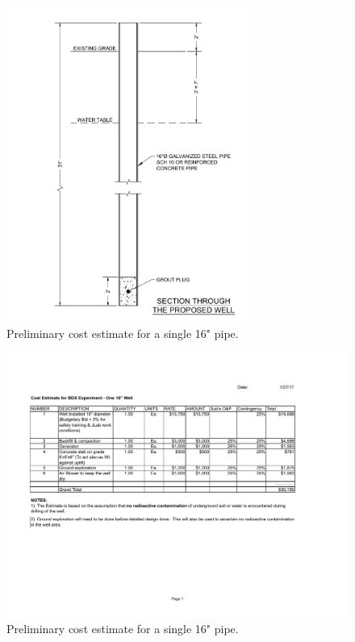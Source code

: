\begin{figure}[thp] 
\center
\includegraphics[width=8cm,clip=true]{figs/Well_Section_Bid.pdf}
\caption{Preliminary cost estimate for a single 16" pipe.}
\label{fig:Well_Section_Bid}
\end{figure}

\begin{figure}[thp] 
\center
\includegraphics[width=17cm,clip=true]{figs/Preliminary_Cost_Estimate_16_Inch_pipe-Rev1.pdf}
\caption{Preliminary cost estimate for a single 16" pipe.}
\label{fig:Preliminary_Cost_Estimate_16_Inch_pipe-Rev1}
\end{figure}

